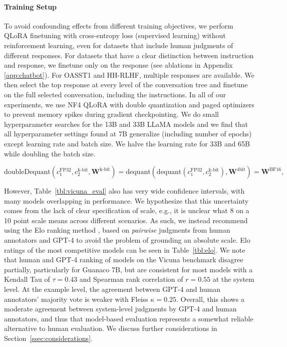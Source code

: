\paragraph{Training Setup} To avoid confounding effects from different training objectives, we perform QLoRA finetuning with cross-entropy loss (supervised learning) without reinforcement learning, even for datasets that include human judgments of different responses. For datasets that have a clear distinction between instruction and response, we finetune only on the response (see ablations in Appendix \ref{app:chatbot}). For OASST1 and HH-RLHF, multiple responses are available. We then select the top response at every level of the conversation tree and finetune on the full selected conversation, including the instructions. In all of our experiments, we use NF4 \textsc{QLoRA} with double quantization and paged optimizers to prevent memory spikes during gradient checkpointing. We do small hyperparameter searches for the 13B and 33B LLaMA models and we find that all hyperparameter settings found at 7B generalize (including number of epochs) except learning rate and batch size. We halve the learning rate for 33B and 65B while doubling the batch size. 

\begin{equation}
    \text{doubleDequant}(c_1^{\text{FP32}}, c_2^{\text{k-bit}}, \mathbf{W}^{\text{k-bit}}) = \text{dequant}(\text{dequant}(c_1^{\text{FP32}}, c_2^{\text{k-bit}}), \mathbf{W}^{\text{4bit}}) = \mathbf{W}^{\text{BF16}},
\end{equation}

However, Table~\ref{tbl:vicuna_eval} also has very wide confidence intervals, with many models overlapping in performance. We hypothesize that this uncertainty comes from the lack of clear specification of scale, e.g., it is unclear what 8 on a 10 point scale means across different scenarios. As such, we instead recommend using the Elo ranking method \citep{elo1967proposed}, based on \textit{pairwise} judgments from human annotators and GPT-4 to avoid the problem of grounding an absolute scale. Elo ratings of the most competitive models can be seen in Table~\ref{tbl:elo}. We note that human and GPT-4 ranking of models on the Vicuna benchmark disagree partially, particularly for Guanaco 7B, but are consistent for most models with a Kendall Tau of $\tau=0.43$ and Spearman rank correlation of $r=0.55$ at the system level. At the example level, the agreement between GPT-4 and human annotators' majority vote is weaker with Fleiss $\kappa=0.25$. Overall, this shows a moderate agreement between system-level judgments by GPT-4 and human annotators, and thus that model-based evaluation represents a somewhat reliable alternative to human evaluation. We discuss further considerations in Section~\ref{ssec:considerations}.


